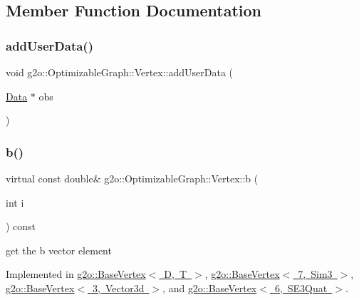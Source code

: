 \subsection{Member Function Documentation}
\mbox{\label{classg2o_1_1_optimizable_graph_1_1_vertex_a8f7ac810cad82a004365c1221fd16234}} 
\subsubsection{\texorpdfstring{add\+User\+Data()}{addUserData()}}
{\footnotesize\ttfamily void g2o\+::\+Optimizable\+Graph\+::\+Vertex\+::add\+User\+Data (\begin{DoxyParamCaption}\item[{\mbox{\hyperlink{classg2o_1_1_optimizable_graph_1_1_data}{Data}} $\ast$}]{obs }\end{DoxyParamCaption})\hspace{0.3cm}{\ttfamily [inline]}}

\mbox{\label{classg2o_1_1_optimizable_graph_1_1_vertex_a79afa60eb11928eeeb1b97f2d2a30732}} 
\subsubsection{\texorpdfstring{b()}{b()}\hspace{0.1cm}{\footnotesize\ttfamily [1/2]}}
{\footnotesize\ttfamily virtual const double\& g2o\+::\+Optimizable\+Graph\+::\+Vertex\+::b (\begin{DoxyParamCaption}\item[{int}]{i }\end{DoxyParamCaption}) const\hspace{0.3cm}{\ttfamily [pure virtual]}}



get the b vector element 



Implemented in \mbox{\hyperlink{classg2o_1_1_base_vertex_a837ef1047343d927edb48ad8d510fe90}{g2o\+::\+Base\+Vertex$<$ D, T $>$}}, \mbox{\hyperlink{classg2o_1_1_base_vertex_a837ef1047343d927edb48ad8d510fe90}{g2o\+::\+Base\+Vertex$<$ 7, Sim3 $>$}}, \mbox{\hyperlink{classg2o_1_1_base_vertex_a837ef1047343d927edb48ad8d510fe90}{g2o\+::\+Base\+Vertex$<$ 3, Vector3d $>$}}, and \mbox{\hyperlink{classg2o_1_1_base_vertex_a837ef1047343d927edb48ad8d510fe90}{g2o\+::\+Base\+Vertex$<$ 6, S\+E3\+Quat $>$}}.

